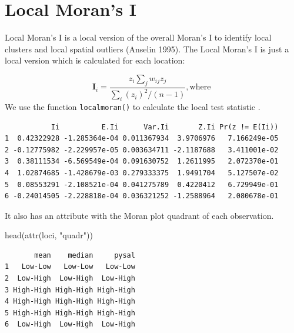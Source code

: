 \documentclass[
  letterpaper,
]{scrbook}
\newenvironment{Shaded}{\begin{snugshade}}{\end{snugshade}}
\newcommand{\AttributeTok}[1]{\textcolor[rgb]{0.40,0.45,0.13}{#1}}
\newcommand{\FunctionTok}[1]{\textcolor[rgb]{0.28,0.35,0.67}{#1}}
\newcommand{\NormalTok}[1]{\textcolor[rgb]{0.00,0.23,0.31}{#1}}
\newcommand{\OtherTok}[1]{\textcolor[rgb]{0.00,0.23,0.31}{#1}}
\newcommand{\SpecialCharTok}[1]{\textcolor[rgb]{0.37,0.37,0.37}{#1}}
\newcommand{\StringTok}[1]{\textcolor[rgb]{0.13,0.47,0.30}{#1}}
\begin{document}
\hypertarget{local-morans-i}{%
\section{Local Moran's I}\label{local-morans-i}}

Local Moran's I is a local version of the overall Moran's I to identify
local clusters and local spatial outliers (Anselin 1995). The Local
Moran's I is just a local version which is calculated for each location:

\[      
        \boldsymbol{\mathbf{I}}_i  =  
        \frac{z_i \sum_j w_{ij}z_j}
            {\sum_i (z_i)^2 / (n-1)}, \text{where }
\] We use the function \texttt{localmoran()} to calculate the local test
statistic .

\begin{Shaded}
\end{Shaded}

\begin{verbatim}
           Ii          E.Ii      Var.Ii       Z.Ii Pr(z != E(Ii))
1  0.42322928 -1.285364e-04 0.011367934  3.9706976   7.166249e-05
2 -0.12775982 -2.229957e-05 0.003634711 -2.1187688   3.411001e-02
3  0.38111534 -6.569549e-04 0.091630752  1.2611995   2.072370e-01
4  1.02874685 -1.428679e-03 0.279333375  1.9491704   5.127507e-02
5  0.08553291 -2.108521e-04 0.041275789  0.4220412   6.729949e-01
6 -0.24014505 -2.228818e-04 0.036321252 -1.2588964   2.080678e-01
\end{verbatim}

It also has an attribute with the Moran plot quadrant of each
observation.

\begin{Shaded}
\begin{Highlighting}[]
\FunctionTok{head}\NormalTok{(}\FunctionTok{attr}\NormalTok{(loci, }\StringTok{"quadr"}\NormalTok{))}
\end{Highlighting}
\end{Shaded}

\begin{verbatim}
       mean    median     pysal
1   Low-Low   Low-Low   Low-Low
2  Low-High  Low-High  Low-High
3 High-High High-High High-High
4 High-High High-High High-High
5 High-High High-High High-High
6  Low-High  Low-High  Low-High
\end{verbatim}
\end{document}
